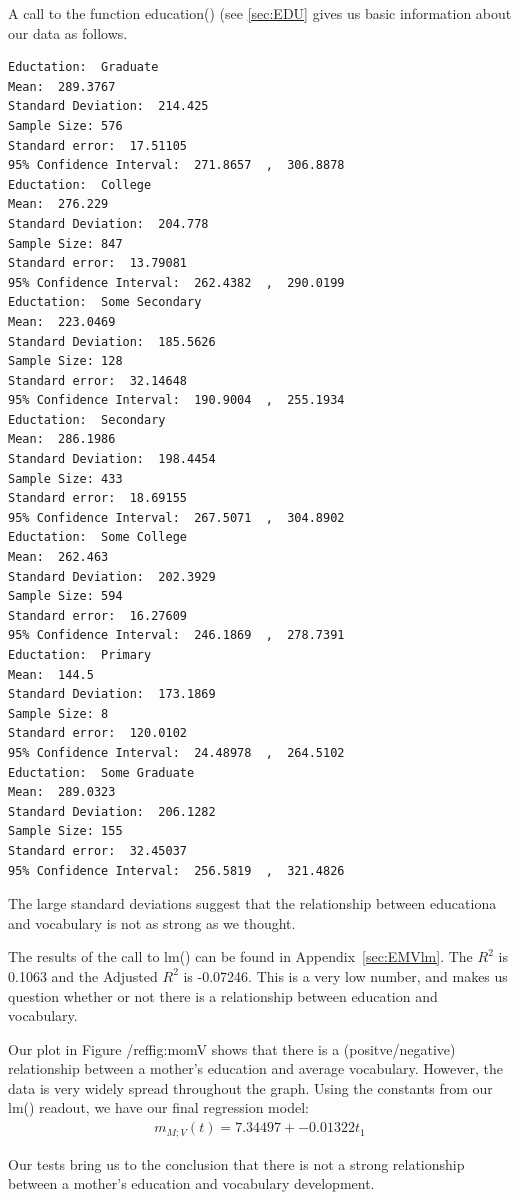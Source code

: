 \documentclass[11pt]{article}  %
\begin{document}
\indent A call to the function education() (see \ref{sec:EDU} gives us basic information about our data as follows.
\begin{lstlisting}
Eductation:  Graduate 
Mean:  289.3767 
Standard Deviation:  214.425 
Sample Size: 576 
Standard error:  17.51105 
95% Confidence Interval:  271.8657  ,  306.8878 
Eductation:  College 
Mean:  276.229 
Standard Deviation:  204.778 
Sample Size: 847 
Standard error:  13.79081 
95% Confidence Interval:  262.4382  ,  290.0199 
Eductation:  Some Secondary 
Mean:  223.0469 
Standard Deviation:  185.5626 
Sample Size: 128 
Standard error:  32.14648 
95% Confidence Interval:  190.9004  ,  255.1934 
Eductation:  Secondary 
Mean:  286.1986 
Standard Deviation:  198.4454 
Sample Size: 433 
Standard error:  18.69155 
95% Confidence Interval:  267.5071  ,  304.8902 
Eductation:  Some College 
Mean:  262.463 
Standard Deviation:  202.3929 
Sample Size: 594 
Standard error:  16.27609 
95% Confidence Interval:  246.1869  ,  278.7391 
Eductation:  Primary 
Mean:  144.5 
Standard Deviation:  173.1869 
Sample Size: 8 
Standard error:  120.0102 
95% Confidence Interval:  24.48978  ,  264.5102 
Eductation:  Some Graduate 
Mean:  289.0323 
Standard Deviation:  206.1282 
Sample Size: 155 
Standard error:  32.45037 
95% Confidence Interval:  256.5819  ,  321.4826 
\end{lstlisting}
\indent The large standard deviations suggest that the relationship between educationa and vocabulary is not as strong as we thought.

\indent The results of the call to lm() can be found in Appendix~\ref{sec:EMVlm}. The $R^2$ is 0.1063 and the Adjusted $R^2$ is -0.07246. This is a very low number, and makes us question whether or not there is a relationship between education and vocabulary.

Our plot in Figure /ref{fig:momV} shows that there is a (positve/negative) relationship between a mother's education and average vocabulary. However, the data is very widely spread throughout the graph. Using the constants from our lm() readout, we have our final regression model:
    \begin{align*}
        m_{M;V}(t) = 7.34497 + -0.01322 t_1
    \end{align*}

\indent Our tests bring us to the conclusion that there is not a strong relationship between a mother's education and vocabulary development.
\end{document}
